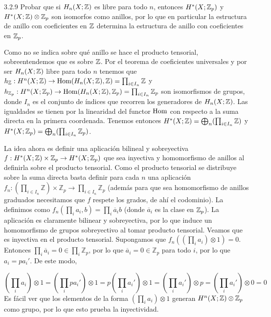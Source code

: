 \documentclass[twoside]{article}
\begin{document}
\begin{ejercicio}{3.2.9}
Probar que si $H_n(X; \mathbb{Z})$ es libre para todo $n$, entonces $H^*(X; \mathbb{Z}_p)$ y $H^*(X; \mathbb{Z})\otimes \mathbb{Z}_p$ son isomorfos como anillos, por lo que en particular la estructura de anillo con coeficientes en $\mathbb{Z}$ determina la estructura de anillo con coeficientes en $\mathbb{Z}_p$. 

\end{ejercicio}
\begin{solucion}

Como no se indica sobre qué anillo se hace el producto tensorial, sobreentendemos que es sobre $\mathbb{Z}$. Por el teorema de coeficientes universales y por ser $H_n(X;\mathbb{Z})$ libre para todo $n$ tenemos que $h_{\mathbb{Z}}:H^n(X;\mathbb{Z})\to\operatorname{Hom}(H_n(X;\mathbb{Z}),\mathbb{Z})=\prod_{i\in I_n}\mathbb{Z}$ y $h_{\mathbb{Z}_p}:H^n(X;\mathbb{Z}_p)\to\operatorname{Hom}(H_n(X;\mathbb{Z}),\mathbb{Z}_p)=\prod_{i\in I_n}\mathbb{Z}_p$ son isomorfismos de grupos, donde $I_n$ es el conjunto de índices que recorren los generadores de $H_n(X;\mathbb{Z})$. Las igualdades se tienen por la linearidad del functor $\operatorname{Hom}$ con respecto a la suma directa en la primera coordenada. Tenemos entonces $H^*(X;\mathbb{Z})=\bigoplus_n(\prod_{i\in I_n}\mathbb{Z})$ y $H^*(X;\mathbb{Z}_p)=\bigoplus_n(\prod_{i\in I_n}\mathbb{Z}_p)$.

La idea ahora es definir una aplicación bilineal y sobreyectiva $f:H^*(X;\mathbb{Z})\times \mathbb{Z}_p\to H^*(X;\mathbb{Z}_p)$ que sea inyectiva y homomorfismo de anillos al definirla sobre el producto tensorial. Como el producto tensorial se distribuye sobre la suma directa basta definir para cada $n$ una aplicación $f_n:(\prod_{i\in I_n}\mathbb{Z})\times\mathbb{Z}_p\to \prod_{i\in I_n}\mathbb{Z}_p$ (además para que sea homomorfismo de anillos graduados necesitamos que $f$ respete los grados, de ahí el codominio). La definimos como $f_n(\prod_i a_i,b)=\prod_i \overline{a}_i b$ (donde $\overline{a}_i$ es la clase en $\mathbb{Z}_p$). La aplicación es claramente bilinear y sobreyectiva, por lo que induce un homomorfismo de grupos sobreyectivo al tomar producto tensorial. Veamos que es inyectiva en el producto tensorial. Supongamos que $f_n((\prod_ia_i)\otimes 1)=0$. Entonces $\prod_i\overline{a}_i=0\in\prod_i\mathbb{Z}_p$, por lo que $\overline{a}_i=0\in\mathbb{Z}_p$ para todo $i$, por lo que $a_i=pa_i'$. De este modo, 

$$\left(\prod_ia_i\right)\otimes 1=\left(\prod_i pa_i'\right)\otimes 1=p\left(\prod_ia_i'\right)\otimes 1=\left(\prod_ia_i'\right)\otimes p=\left(\prod_ia_i'\right)\otimes 0=0$$
Es fácil ver que los elementos de la forma $(\prod_ia_i)\otimes 1$ generan $H^n(X;\mathbb{Z})\otimes\mathbb{Z}_p$ como grupo, por lo que esto prueba la inyectividad. 


\end{solucion}
\end{document}
